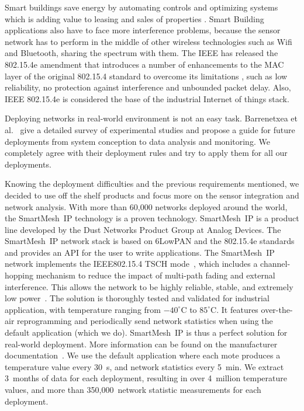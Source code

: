 \documentclass{elsarticle}
\newcommand{\smip}                {SmartMesh~IP\xspace}
\newcommand{\building}            {Smart Building\xspace}
\begin{document}
Smart buildings save energy by automating controls and optimizing systems which is adding value to leasing and sales of properties \cite{king2017smart}. \building applications also have to face more interference problems, because the sensor network has to perform in the middle of other wireless technologies such as Wifi and Bluetooth, sharing the spectrum with them. 
The IEEE has released the 802.15.4e amendment that
introduces a number of enhancements to the MAC
layer of the original 802.15.4 standard to overcome its limitations \cite{de2016ieee}, 
such as low reliability, no protection against interference and unbounded packet delay. 
Also, IEEE 802.15.4e is considered the base of the industrial Internet of things stack.

Deploying networks in real-world environment is not an easy task.
Barrenetxea et al.~\cite{barrenetxea08hitchhiker} give a detailed survey of experimental studies and propose a guide for future deployments from system conception to data analysis and monitoring.
We completely agree with their deployment rules and try to apply them for all our deployments.

Knowing the deployment difficulties and the previous requirements mentioned, we decided to use off the shelf products and focus more on the sensor integration and network analysis.
With more than 60,000 networks deployed around the world, the \smip technology is a proven technology.
\smip is a product line developed by the Dust Networks Product Group at Analog Devices.
The \smip network stack is based on 6LowPAN and the 802.15.4e standards and provides an API for the user to write applications.
The \smip network implements the IEEE802.15.4 TSCH mode~\cite{std_ieee802154_2015}, which includes a channel-hopping mechanism to reduce the impact of multi-path fading and external interference.
This allows the network to be highly reliable, stable, and extremely low power~\cite{watteyne10mitigating,watteyne09reliability}.
The solution is thoroughly tested and validated for industrial application, with temperature ranging from $-40^{\circ}$C to $85^{\circ}$C.
It features over-the-air reprogramming and periodically send network statistics when using the default application (which we do).
\smip is thus a perfect solution for real-world deployment.
More information can be found on the manufacturer documentation~\cite{smip_app_note}.
We use the default application where each mote produces a temperature value every 30~s, and network statistics every 5~min.
We extract 3~months of data for each deployment, resulting in over 4~million temperature values, and more than 350,000~network statistic measurements for each deployment.
\end{document}
